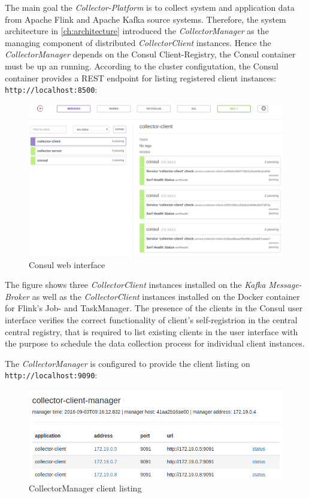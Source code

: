 The main goal the \textit{Collector-Platform} is to collect system and application data from Apache Flink and Apache Kafka source systems.
Therefore, the system architecture in \autoref{ch:architecture} introduced the \textit{CollectorManager} as the managing component
of distributed \textit{CollectorClient} instances. Hence the \textit{CollectorManager} depends on the Consul Client-Registry,
the Consul container must be up an running. According to the cluster configutation, the Consul container provides a REST endpoint
for listing registered client instances:
\verb|http://localhost:8500|:
\begin{figure}[H]
	\centering
	\includegraphics[width=1.0\textwidth]{../images/08-consul.png}
	\caption{Consul web interface}
	\label{fig:consul-web}
\end{figure}

The figure shows three \textit{CollectorClient} instances installed on the \textit{Kafka Message-Broker} as well as the \textit{CollectorClient} instances installed
on the Docker container for Flink's Job- and TaskManager. The presence of the clients in the Consul user interface verifies the
correct functionality of client's self-registrion in the central central registry, that is required to list existing clients in
the user interface with the purpose to schedule the data collection process for individual client instances.

The \textit{CollectorManager} is configured to provide the client listing on \verb|http://localhost:9090|:
\begin{figure}[H]
	\centering
	\includegraphics[width=1.0\textwidth]{../images/09-cm-start.png}
	\caption{CollectorManager client listing}
	\label{fig:cm-start}
\end{figure}

